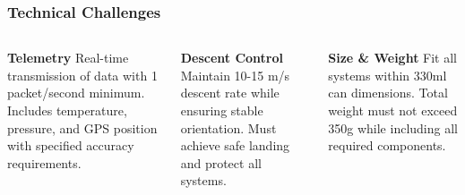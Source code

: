 \begin{frame}
\frametitle{Technical Challenges}
\begin{columns}[T]
    \begin{column}{0.3\textwidth}
    \textbf{Telemetry}
    \small
    Real-time transmission of data with 1 packet/second minimum. Includes temperature, pressure, and GPS position with specified accuracy requirements.
    \end{column}
    
    \begin{column}{0.3\textwidth}
    \textbf{Descent Control}
    \small
    Maintain 10-15 m/s descent rate while ensuring stable orientation. Must achieve safe landing and protect all systems.
    \end{column}
    
    \begin{column}{0.3\textwidth}
    \textbf{Size \& Weight}
    \small
    Fit all systems within 330ml can dimensions. Total weight must not exceed 350g while including all required components.
    \end{column}
\end{columns}
\end{frame}